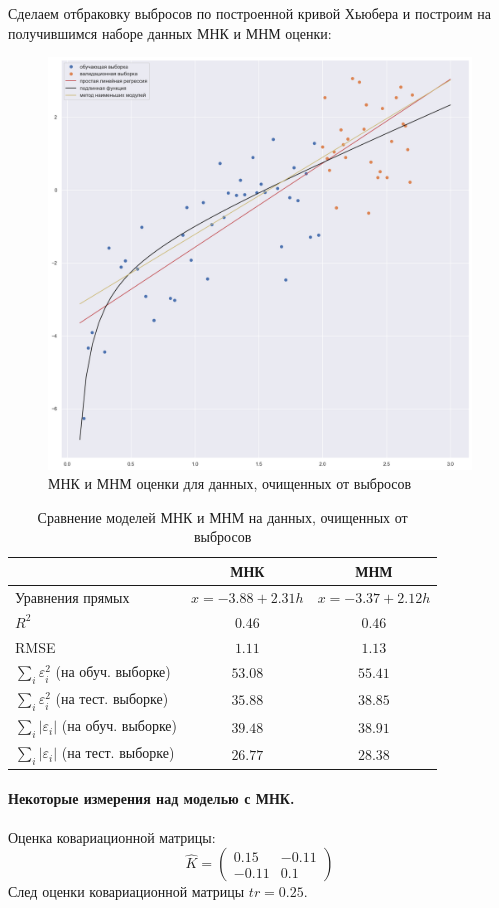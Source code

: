 \documentclass[a4paper,12pt]{article}
\begin{document}
Сделаем отбраковку выбросов по построенной кривой Хьюбера и построим на получившимся наборе данных МНК и МНМ оценки:

\begin{figure}[H]
    \centering
    \includegraphics[width=0.5\linewidth]{src/img/данные_без_выбросов.png}
    \caption{МНК и МНМ оценки для данных, очищенных от выбросов}
\end{figure}

\begin{table}[H]
    \centering
    \begin{tabular}{|l|c|c|}
        \hline
        & МНК & МНМ \\ \hline
        Уравнения прямых & $x = -3.88 + 2.31 h$ & $x = -3.37 + 2.12 h$ \\ \hline
        $R^2$ & $0.46$ & $0.46$ \\ \hline
        RMSE & $1.11$ & $1.13$ \\ \hline
        $\sum\limits_i \varepsilon_i^2$ (на обуч. выборке) & $53.08$ & $55.41$ \\ \hline
        $\sum\limits_i \varepsilon_i^2$ (на тест. выборке) & $35.88$ & $38.85$ \\ \hline
        $\sum\limits_i |\varepsilon_i|$ (на обуч. выборке) & $39.48$ & $38.91$ \\ \hline
        $\sum\limits_i |\varepsilon_i|$ (на тест. выборке) & $26.77$ & $28.38$ \\ \hline
    \end{tabular}
    \caption{Сравнение моделей МНК и МНМ на данных, очищенных от выбросов}
\end{table}


\paragraph{Некоторые измерения над моделью с МНК.\\}
Оценка ковариационной матрицы:
$$ \hat{K} = 
\begin{pmatrix}
    0.15 & -0.11\\
    -0.11 & 0.1
\end{pmatrix}
$$
След оценки ковариационной матрицы $tr = 0.25$.
\end{document}
